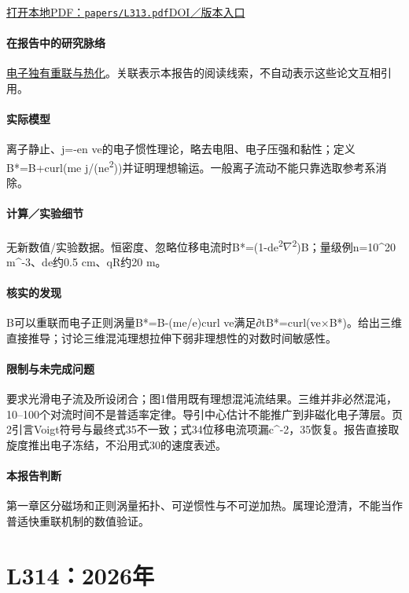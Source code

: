 \href{run:papers/L313.pdf}{打开本地PDF：\texttt{papers/L313.pdf}}\quad\href{https://doi.org/10.1063/5.0304789}{DOI／版本入口}

\paragraph{在报告中的研究脉络}\hyperref[story:energy]{电子独有重联与热化}。关联表示本报告的阅读线索，不自动表示这些论文互相引用。

\paragraph{实际模型}离子静止、j=-en ve的电子惯性理论，略去电阻、电子压强和黏性；定义B*=B+curl(me j/(ne\textsuperscript{2}))并证明理想输运。一般离子流动不能只靠选取参考系消除。

\paragraph{计算／实验细节}无新数值/实验数据。恒密度、忽略位移电流时B*=(1-de\textsuperscript{2}\ensuremath{\nabla}\textsuperscript{2})B；量级例n=10\textasciicircum{}20 m\textasciicircum{}-3、de约0.5 cm、qR约20 m。

\paragraph{核实的发现}B可以重联而电子正则涡量B*=B-(me/e)curl ve满足∂tB*=curl(ve×B*)。给出三维直接推导；讨论三维混沌理想拉伸下弱非理想性的对数时间敏感性。

\paragraph{限制与未完成问题}要求光滑电子流及所设闭合；图1借用既有理想混沌流结果。三维并非必然混沌，10–100个对流时间不是普适率定律。导引中心估计不能推广到非磁化电子薄层。页2引言Voigt符号与最终式35不一致；式34位移电流项漏c\textasciicircum{}-2，35恢复。报告直接取旋度推出电子冻结，不沿用式30的速度表述。

\paragraph{本报告判断}第一章区分磁场和正则涡量拓扑、可逆惯性与不可逆加热。属理论澄清，不能当作普适快重联机制的数值验证。

\section{L314：2026年}\label{paper:L314}

